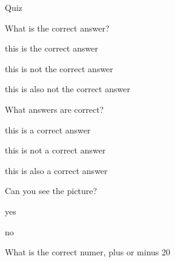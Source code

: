 \documentclass[letterpaper,10pt]{article}
\begin{document}
\begin{center}
{\Large Quiz}
\end{center}


\begin{compactenum} 
\begin{minipage}{\linewidth}
    \item \label{1} What is the correct answer?
    \begin{compactenum} 
        \item \label{11} this is the correct answer
        \item \label{12} this is not the correct answer
        \item \label{13} this is also not the correct answer
    \end{compactenum}
    
    \end{minipage}

    \vspace{10pt}

\begin{minipage}{\linewidth}
    \item \label{2} What answers are correct?
    \begin{compactenum} 
        \item \label{21} this is a correct answer
        \item \label{22} this is not a correct answer
        \item \label{23} this is also a correct answer
    \end{compactenum}
    
    \end{minipage}

    \vspace{10pt}

\begin{minipage}{\linewidth}
    \item \label{3} Can you see the picture?
    \begin{compactenum} 
        \item \label{31} yes
        \item \label{32} no
    \end{compactenum}
    
    \end{minipage}

    \vspace{10pt}

\begin{minipage}{\linewidth}
    \item \label{4} What is the correct numer, plus or minus 20%
    

\end{minipage}
\end{compactenum}
\end{document}
